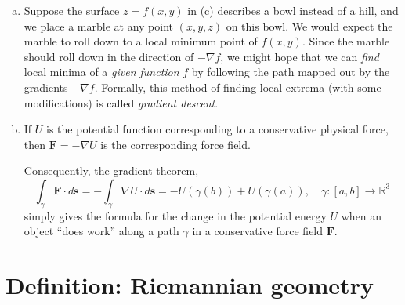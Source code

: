 \documentclass[12pt]{article}
\newcommand{\real}{\mathbb{R}}
\providecommand{\defnterm}[1]{\emph{#1}}
\newcommand{\vF}{\mathbf{F}}
\newcommand{\vs}{\mathbf{s}}
\begin{document}
\begin{enumerate}[(a)]
\item
Suppose the surface $z = f(x, y)$ in (c) describes a bowl instead of a hill,
and we place a marble at any point $(x, y, z)$ on this bowl.
We would expect the marble to roll down to a local minimum point of $f(x, y)$.
Since the marble should roll down in the direction of $-\nabla f$,
we might hope that we can \emph{find} local minima
of a \emph{given function} $f$ by following the path mapped out
by the gradients $-\nabla f$.  Formally, this method of
finding local extrema (with some modifications) is called \defnterm{gradient descent}.


\item
If $U$ is the potential function corresponding to a
conservative physical force, then $\vF = -\nabla U$
is the corresponding force field.

Consequently, the gradient theorem,
\[
\int_\gamma \vF \cdot d\vs = -\int_\gamma \nabla U \cdot d\vs = -U(\gamma(b)) + U(\gamma(a)), \quad \gamma\colon [a, b] \to \real^3
\]
simply gives the formula for the change in the potential energy $U$
when an object ``does work'' along a path $\gamma$ in a conservative force field $\vF$.

\end{enumerate}





\section{Definition: Riemannian geometry}
\end{document}
